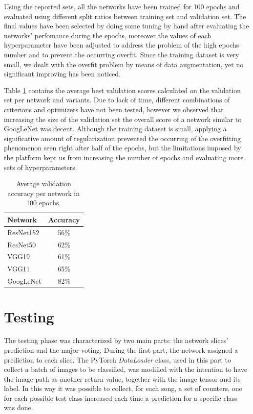\documentclass[10pt,twocolumn,letterpaper]{article}
\begin{document}
Using the reported sets, all the networks have been trained for 100 epochs and evaluated using different split ratios between training set and validation set. The final values have been selected by doing some tuning by hand after evaluating the networks' perfomance during the epochs, moreover the values of each hyperparameter have been adjusted to address the problem of the high epochs number and to prevent the occurring overfit. Since the training dataset is very small, we dealt with the overfit problem by means of data augmentation, yet no significant improving has been noticed.

Table \ref{tab:val} contains the average best validation scores calculated on the validation set per network and variants. Due to lack of time, different combinations of criterions and optimizers have not been tested, however we observed that increasing the size of the validation set the overall score of a network similar to GoogLeNet was decent. Although the training dataset is small, applying a significative amount of regularization prevented the occurring of the overfitting phenomenon seen right after half of the epochs, but the limitations imposed by the platform kept us from increasing the number of epochs and evaluating more sets of hyperparameters.

\begin{table}[!h]
   \begin{center}
   \def\arraystretch{1.5}
   \begin{tabular}{l|c}
      \textbf{Network} & \textbf{Accuracy} \\
   \hline
   ResNet152 & 56\%  \\
   \hline
   ResNet50 & 62\%  \\
   \hline
   VGG19 & 61\% \\
   \hline
   VGG11 & 65\% \\
   \hline
   GoogLeNet & 82\% \\
   \end{tabular}
   \end{center}
   \caption{Average validation accuracy per network in 100 epochs.}
   \label{tab:val}
   \end{table}

\section{Testing}\label{testing}

The testing phase was characterized by two main parts: the network slices' prediction and the major voting.
During the first part, the network assigned a prediction to each slice. The PyTorch \textit{DataLoader} class, used in this part to collect a batch of images to be classified, was modified with the intention to have the image path as another return value, together with the image tensor and its label. In this way it was possible to collect, for each song, a set of counters, one for each possible test class increased each time a prediction for a specific class was done.
\end{document}
